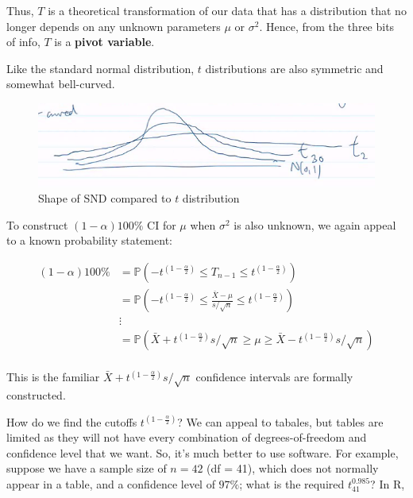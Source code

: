 Thus, \(T\) is a theoretical transformation of our data that has a distribution that no longer depends on any unknown parameters \(\mu\) or \(\sigma^2\). 
Hence, from the three bits of info, \(T\) is a \textbf{pivot variable}. 

Like the standard normal distribution, \(t\) distributions are also symmetric and somewhat bell-curved. 

\begin{figure}[H]
    \centering
    \includegraphics[width=\textwidth]{w7lec2fig1.png}
    \caption{Shape of SND compared to \(t\) distribution}
    \label{fig:shape of SND, t dist}
\end{figure}

To construct \((1-\alpha)100\%\) CI for \(\mu\) when \(\sigma^2\) is also unknown, we again appeal to a known probability statement:

\begin{align*}
    (1-\alpha)100\% &= \mathbb{P}(-t^{\left(1-\frac{\alpha}{2}\right)} \leq T_{n-1} \leq t^{\left(1-\frac{\alpha}{2}\right)})\\
    &= \mathbb{P}(-t^{\left(1-\frac{\alpha}{2}\right)} \leq \frac{\bar{X} - \mu}{s/\sqrt{n}} \leq t^{\left(1-\frac{\alpha}{2}\right)})\\
    &\vdots\\
    &= \mathbb{P}(\bar{X} + t^{\left(1-\frac{\alpha}{2}\right)}s/\sqrt{n} \geq \mu \geq \bar{X} - t^{\left(1-\frac{\alpha}{2}\right)}s/\sqrt{n})\\
\end{align*}

This is the familiar \(\bar{X} + t^{\left(1-\frac{\alpha}{2}\right)}s/\sqrt{n}\) confidence intervals are formally constructed. 

\bigskip

How do we find the cutoffs \(t^{\left(1-\frac{\alpha}{2}\right)}\)? 
We can appeal to tabales, but tables are limited as they will not have every combination of degrees-of-freedom and confidence level that we want. 
So, it's much better to use software. 
For example, suppose we have a sample size of \(n=42\) (df = 41), which does not normally appear in a table, and a confidence level of \(97\%\); 
what is the required \(t_{41}^{0.985}\)? In R,

